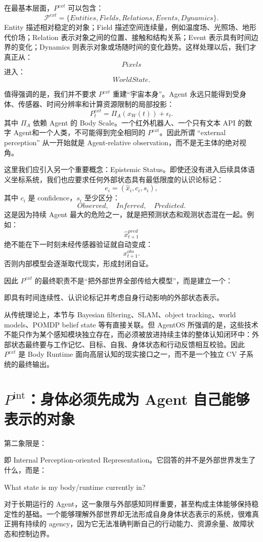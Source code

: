 在最基本层面，$P^{ext}$ 可以包含：
\[
\mathcal P^{ext}
=
\{
Entities,
Fields,
Relations,
Events,
Dynamics
\}.
\]
Entity 描述相对稳定的对象；Field 描述空间连续量，例如温度场、光照场、地形代价场；Relation 表示对象之间的位置、接触和结构关系；Event 表示具有时间边界的变化；Dynamics 则表示对象或场随时间的变化趋势。这样处理以后，我们才真正从：
\[
Pixels
\]
进入：
\[
WorldState.
\]

值得强调的是，我们并不要求 $P^{ext}$ 重建``宇宙本身''。Agent 永远只能得到受身体、传感器、时间分辨率和计算资源限制的局部投影：
\[
P_t^{ext}
=
\Pi_A(
x_W(t)
)
+
\epsilon_t.
\]
其中 $\Pi_A$ 依赖 Agent 的 Body Scale。一个红外机器人、一个只有文本 API 的数字 Agent和一个人类，不可能得到完全相同的 $P^{ext}$。因此所谓 ``external perception'' 从一开始就是 Agent-relative observation，而不是无主体的绝对视角。

这里我们应引入另一个重要概念：Epistemic Status。即使还没有进入后续具体语义坐标系统，我们也应要求任何外部状态具有最低限度的认识论标记：
\[
e_i
=
(
\hat{x}_i,
c_i,
s_i
),
\]
其中 $c_i$ 是 confidence，$s_i$ 至少区分：
\[
Observed,\quad Inferred,\quad Predicted.
\]
这是因为持续 Agent 最大的危险之一，就是把预测状态和观测状态混在一起。例如：
\[
\hat{x}_{t+1}^{pred}
\]
绝不能在下一时刻未经传感器验证就自动变成：
\[
x_{t+1}^{obs}.
\]
否则内部模型会逐渐取代现实，形成封闭自证。

因此 $P^{ext}$ 的最终职责不是``把外部世界全部传给大模型''，而是建立一个：
\begin{statementbox}
\centering
{}
\end{statementbox}
即具有时间连续性、认识论标记并考虑自身行动影响的外部状态表示。

从传统理论上，本节与 Bayesian filtering、SLAM、object tracking、world models、POMDP belief state 等有直接关联。但 AgentOS 所强调的是，这些技术不能只作为某个感知模块独立存在，而必须被放进持续主体的整体认知闭环中：外部状态最终要与工作记忆、目标、自我、身体状态和行动反馈相互校验。因此 $P^{ext}$ 是 Body Runtime 面向高层认知的现实接口之一，而不是一个独立 CV 子系统的最终输出。

\section{$P^{\mathrm{int}}$：身体必须先成为 Agent 自己能够表示的对象}
\label{sec:internal-perception}

第二象限是：
\begin{statementbox}
\centering
{}
\end{statementbox}
即 Internal Perception-oriented Representation。它回答的并不是外部世界发生了什么，而是：
\begin{statementbox}
What state is my body/runtime currently in?
\end{statementbox}
对于长期运行的 Agent，这一象限与外部感知同样重要，甚至构成主体能够保持稳定性的基础。一个能够理解外部世界却无法形成自身身体状态表示的系统，很难真正拥有持续的 agency，因为它无法准确判断自己的行动能力、资源余量、故障状态和控制边界。

